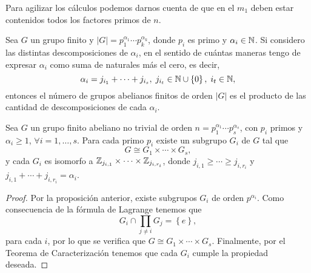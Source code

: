 \begin{observation}
Para agilizar los cálculos podemos darnos cuenta de que en el $\displaystyle m_{1} $ deben estar contenidos todos los factores primos de $\displaystyle n $.
\end{observation}
\begin{observation}
Sea $\displaystyle G $ un grupo finito y $\displaystyle \left|G\right| = p_{1}^{\alpha_{1}} \cdots p_{k}^{\alpha_{k}} $, donde $\displaystyle p_{i} $ es primo y $\displaystyle \alpha_{i} \in \mathbb{N} $. Si considero las distintas descomposiciones de $\displaystyle \alpha_{i} $, en el sentido de cuántas maneras tengo de expresar $\displaystyle \alpha_{i} $ como suma de naturales más el cero, es decir,
\[\alpha_{i} = j_{i_{1}} + \cdots + j_{i_{s}}, \; j_{i_{t}} \in \mathbb{N} \cup \left\{ 0\right\}, \; i_{t} \in \mathbb{N}  ,\]
entonces el número de grupos abelianos finitos de orden $\displaystyle \left|G\right| $ es el producto de las cantidad de descomposiciones de cada $\displaystyle \alpha_{i} $. 
\end{observation}
\begin{theorem}
Sea $\displaystyle G $ un grupo finito abeliano no trivial de orden $\displaystyle n = p_{1}^{\alpha_{1}} \cdots p_{s}^{\alpha_{s}} $, con $\displaystyle p_{i} $ primos y $\displaystyle \alpha_{i} \geq 1 $, $\displaystyle \forall i = 1, \ldots, s $. Para cada primo $\displaystyle p_{i} $ existe un subgrupo $\displaystyle G_{i} $ de $\displaystyle G $ tal que 
\[G \cong G_{1} \times \cdots \times G_{s} ,\]
y cada $\displaystyle G_{i} $ es isomorfo a $\displaystyle \mathbb{Z}_{j_{i,1}} \times \cdots \times \mathbb{Z}_{j_{i,r_{i}}} $, donde $\displaystyle j_{i,1} \geq \cdots \geq j_{i,r_{i}} $ y $\displaystyle j_{i,1} + \cdots + j_{i,r_{i}} = \alpha_{i} $. 
\end{theorem}
\begin{proof}
Por la proposición anterior, existe subgrupos $\displaystyle G_{i} $ de orden $\displaystyle p^{\alpha_{i}} $. Como consecuencia de la fórmula de Lagrange tenemos que 
\[G_{i} \cap \prod_{j \neq i}G_{j} = \left\{ e\right\}  ,\]
para cada $\displaystyle i $, por lo que se verifica que $\displaystyle G \cong G_{1} \times \cdots \times G_{s} $. Finalmente, por el Teorema de Caracterización tenemos que cada $\displaystyle G_{i} $ cumple la propiedad deseada. 
\end{proof}

